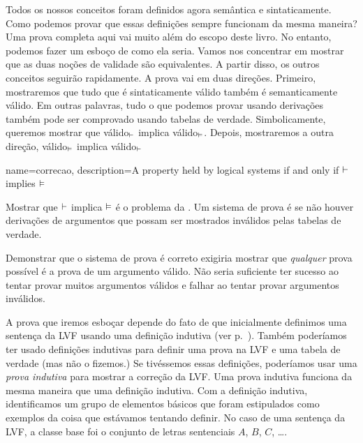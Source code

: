Todos os nossos conceitos foram definidos agora sem\^antica e sintaticamente. Como podemos provar que essas defini\c c\~oes sempre funcionam da mesma maneira? Uma prova completa aqui vai muito al\'em do escopo deste livro. No entanto, podemos fazer um esbo\c co de como ela seria. Vamos nos concentrar em mostrar que as duas no\c c\~oes de validade s\~ao equivalentes. A partir disso, os outros conceitos seguir\~ao rapidamente. A prova vai em duas dire\c c\~oes. Primeiro,  mostraremos que tudo que \'e sintaticamente v\'alido tamb\'em \'e semanticamente v\'alido. Em outras palavras, tudo o que podemos provar usando deriva\c c\~oes tamb\'em pode ser comprovado usando tabelas de verdade. Simbolicamente,  queremos mostrar que  v\'alido$_{\vdash}$ implica v\'alido$_{\vDash}$. Depois, mostraremos a outra  dire\c c\~ao, v\'alido$_{\vDash}$ implica v\'alido$_{\vdash}$

  

{
name=correcao,
description={A property held by logical systems if and only if $\vdash $ implies $\vDash $}
}

Mostrar que $\vdash $ implica  $\vDash $  \'e  o problema da . \label{def:soundness} Um sistema de prova \'e   se n\~ao houver deriva\c c\~oes de argumentos que possam ser mostrados inv\'alidos pelas tabelas de verdade. 
 \label{def_Soundness} 

Demonstrar que o sistema de prova \'e correto exigiria mostrar que  \emph{qualquer} prova poss\'ivel \'e a prova de um argumento v\'alido. N\~ao seria suficiente ter sucesso ao tentar provar muitos argumentos v\'alidos e falhar ao tentar provar argumentos inv\'alidos.

A prova que iremos esbo\c car depende do fato de que inicialmente definimos uma senten\c ca da LVF usando uma defini\c c\~ao indutiva (ver p.~\pageref{TFLsentences}). Tamb\'em poder\'iamos ter usado defini\c c\~oes indutivas para definir uma prova na LVF e uma tabela de verdade (mas n\~ao o fizemos.)  Se tiv\'essemos essas defini\c c\~oes, poder\'iamos usar uma \emph{prova indutiva} para mostrar a corre\c c\~ao da LVF. Uma prova indutiva funciona da mesma maneira que uma defini\c c\~ao indutiva. Com a defini\c c\~ao indutiva, identificamos um grupo de elementos b\'asicos que foram estipulados como exemplos da coisa que est\'avamos tentando definir. No caso de uma senten\c ca da LVF, a classe base foi o conjunto de letras sentenciais $A$, $B$, $C$, \dots. 

